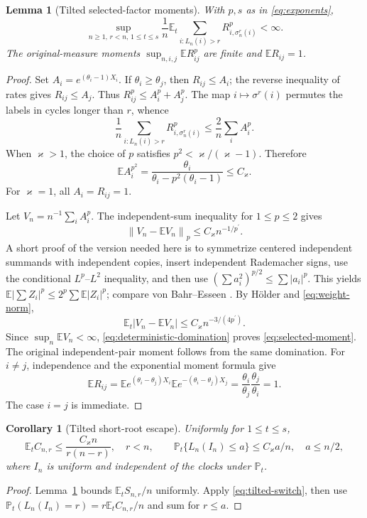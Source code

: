 \documentclass[11pt]{article}
\numberwithin{equation}{section}
\newtheorem{lemma}[theorem]{Lemma}
\newtheorem{corollary}[theorem]{Corollary}
\theoremstyle{definition}
\theoremstyle{remark}
\newcommand{\E}{\mathbb E}
\newcommand{\Pp}{\mathbb P}
\newcommand{\pdual}{{p^{\prime}}}
\newcommand{\norm}[1]{\left\|#1\right\|}
\begin{document}
\begin{lemma}[Tilted selected-factor moments]\label{lem:selected}
With $p,s$ as in \eqref{eq:exponents},
\begin{equation}\label{eq:selected-moment}
 \sup_{n\ge1,\,r<n,\,1\le t\le s}
 \frac1n\E_t\sum_{i:L_n(i)>r}R_{i,\sigma_n^r(i)}^p<\infty.
\end{equation}
The original-measure moments $\sup_{n,i,j}\E R_{ij}^p$ are finite and $\E R_{ij}=1$.
\end{lemma}
\begin{proof}
Set $A_i=e^{(\theta_i-1)X_i}$. If $\theta_i\ge\theta_j$, then $R_{ij}\le A_i$; the reverse inequality of rates gives $R_{ij}\le A_j$. Thus $R_{ij}^p\le A_i^p+A_j^p$. The map $i\mapsto\sigma^r(i)$ permutes the labels in cycles longer than $r$, whence
\begin{equation}\label{eq:deterministic-domination}
 \frac1n\sum_{i:L_n(i)>r}R_{i,\sigma_n^r(i)}^p
 \le\frac2n\sum_i A_i^p.
\end{equation}
When $\varkappa>1$, the choice of $p$ satisfies $p^2<\varkappa/(\varkappa-1)$. Therefore
\[
 \E A_i^{p^2}=\frac{\theta_i}{\theta_i-p^2(\theta_i-1)}\le C_\varkappa.
\]
For $\varkappa=1$, all $A_i=R_{ij}=1$.

Let $V_n=n^{-1}\sum_i A_i^p$. The independent-sum inequality for $1\le p\le2$ gives
\[
 \norm{V_n-\E V_n}_p\le C_\varkappa n^{-1/\pdual}.
\]
A short proof of the version needed here is to symmetrize centered independent summands with independent copies, insert independent Rademacher signs, use the conditional $L^p$--$L^2$ inequality, and then use $(\sum a_i^2)^{p/2}\le\sum|a_i|^p$. This yields $\E|\sum Z_i|^p\le2^p\sum\E|Z_i|^p$; compare von Bahr--Esseen \cite{vBE}.
By H\"older and \eqref{eq:weight-norm},
\[
 \E_t|V_n-\E V_n|\le C_\varkappa n^{-3/(4\pdual)}.
\]
Since $\sup_n\E V_n<\infty$, \eqref{eq:deterministic-domination} proves \eqref{eq:selected-moment}. The original independent-pair moment follows from the same domination. For $i\ne j$, independence and the exponential moment formula give
\[
 \E R_{ij}
 =\E e^{(\theta_i-\theta_j)X_i}
  \E e^{-(\theta_i-\theta_j)X_j}
 =\frac{\theta_i}{\theta_j}\frac{\theta_j}{\theta_i}=1.
\]
The case $i=j$ is immediate.
\end{proof}

\begin{corollary}[Tilted short-root escape]\label{cor:root-escape}
Uniformly for $1\le t\le s$,
\begin{equation}\label{eq:cycle-crude}
 \E_t C_{n,r}\le\frac{C_\varkappa n}{r(n-r)},\quad r<n,
 \qquad
 \Pp_t\{L_n(I_n)\le a\}\le C_\varkappa a/n,\quad a\le n/2,
\end{equation}
where $I_n$ is uniform and independent of the clocks under $\Pp_t$.
\end{corollary}
\begin{proof}
Lemma~\ref{lem:selected} bounds $\E_tS_{n,r}/n$ uniformly. Apply \eqref{eq:tilted-switch}, then use
$\Pp_t(L_n(I_n)=r)=r\E_tC_{n,r}/n$ and sum for $r\le a$.
\end{proof}
\end{document}
